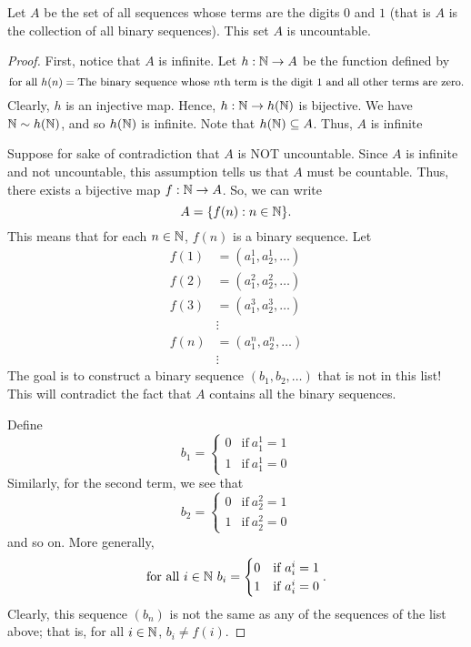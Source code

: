 \documentclass[a4paper]{report}
\begin{document}
\begin{theorem}[D]
Let \( A  \) be the set of all sequences whose terms are the digits \( 0  \) and \( 1  \) (that is \( A  \) is the collection of all binary sequences). This set \( A  \) is uncountable. 
\end{theorem}
\begin{proof}
First, notice that \( A  \) is infinite. Let \( h: \mathbb{N} \to A   \) be the function defined by 
\[  \text{for all} \ h(n) = \text{The binary sequence whose \( n \)th term is the digit 1 and all other terms are zero}. \]
Clearly, \( h  \) is an injective map. Hence, \( h: \mathbb{N} \to h(\mathbb{N}) \) is bijective. We have \( \mathbb{N} \sim h(\mathbb{N}) \), and so \( h(\mathbb{N})  \) is infinite. Note that \( h(\mathbb{N}) \subseteq A  \). Thus, \( A  \) is infinite 

Suppose for sake of contradiction that \( A  \) is NOT uncountable. Since \( A  \) is infinite and not uncountable, this assumption tells us that \( A  \) must be countable. Thus, there exists a bijective map \( f: \mathbb{N} \to A  \). So, we can write
\[  A = \{ f(n) : n \in \mathbb{N}  \}.  \]
This means that for each \( n \in \mathbb{N}  \), \( f(n) \) is a binary sequence. Let 
\begin{align*}
    f(1) &= ({a}_{1}^{1}, {a}_{2}^{1}, \dots) \\
    f(2) &= ({a}_{1}^{2}, {a}_{2}^{2} , \dots ) \\
    f(3) &= ({a}_{1}^{3}, {a}_{2}^{3} , \dots ) \\
         &\vdots \\
    f(n) &= ({a}_{1}^{n}, {a}_{2}^{n}, \dots) \\
        &\vdots
\end{align*}
The goal is to construct a binary sequence \( ({b}_{1}, {b}_{2}, \dots ) \) that is not in this list! This will contradict the fact that \( A  \) contains all the binary sequences.  

Define 
\[  {b}_{1} = 
\begin{cases}
    0 &\text{if} \ {a}_{1}^{1} = 1  \\
    1 &\text{if} \ {a}_{1}^{1} = 0 
\end{cases}  \]
Similarly, for the second term, we see that 
\[  {b}_{2} = 
\begin{cases}
    0 &\text{if} \ {a}_{2}^{2} = 1  \\
    1 &\text{if} \ {a}_{2}^{2} = 0 
\end{cases}  \]
and so on. More generally, 
\[  \text{for all} \ i \in \mathbb{N} \ {b}_{i} = 
\begin{cases}
    0 &\text{if} \ {a}_{i}^{i} = 1 \\
    1 &\text{if} \ {a}_{i}^{i} = 0 
\end{cases}. \]
Clearly, this sequence \( ({b}_{n}) \) is not the same as any of the sequences of the list above; that is, for all \( i \in \mathbb{N}  \), \( {b}_{i} \neq f(i)  \).
\end{proof} 
\end{document}
